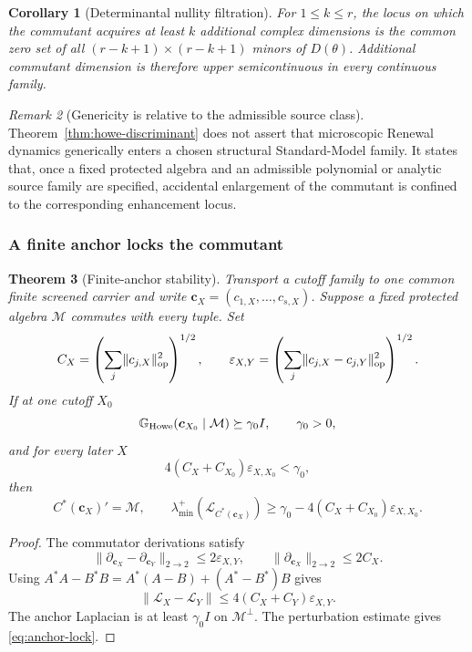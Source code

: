 \documentclass[11pt]{article}
\newtheorem{theorem}{Theorem}[section]
\newtheorem{corollary}[theorem]{Corollary}
\theoremstyle{definition}
\theoremstyle{remark}
\newtheorem{remark}[theorem]{Remark}
\newcommand{\norm}[1]{\lVert#1\rVert}
\newcommand{\M}{\mathcal M}
\begin{document}
\begin{corollary}[Determinantal nullity filtration]
\label{cor:howe-nullity}
For $1\le k\le r$, the locus on which the commutant acquires at least $k$
additional complex dimensions is the common zero set of all
$(r-k+1)\times(r-k+1)$ minors of $D(\theta)$.  Additional commutant dimension
is therefore upper semicontinuous in every continuous family.
\end{corollary}

\begin{remark}[Genericity is relative to the admissible source class]
Theorem~\ref{thm:howe-discriminant} does not assert that microscopic Renewal
dynamics generically enters a chosen structural Standard-Model family.  It
states that, once a fixed protected algebra and an admissible polynomial or
analytic source family are specified, accidental enlargement of the
commutant is confined to the corresponding enhancement locus.
\end{remark}

\subsubsection{A finite anchor locks the commutant}

\begin{theorem}[Finite-anchor stability]
\label{thm:finite-anchor}
Transport a cutoff family to one common finite screened carrier and write
$\bm c_X=(c_{1,X},\ldots,c_{s,X})$.  Suppose a fixed protected algebra $\M$
commutes with every tuple.  Set
\[
C_X=\left(\sum_j\norm{c_{j,X}}_{\rm op}^2\right)^{1/2},
\qquad
\varepsilon_{X,Y}
=
\left(\sum_j\norm{c_{j,X}-c_{j,Y}}_{\rm op}^2\right)^{1/2}.
\]
If at one cutoff $X_0$
\[
\mathbb G_{\rm Howe}(\bm c_{X_0}\mid\M)
\succeq\gamma_0I,
\qquad \gamma_0>0,
\]
and for every later $X$
\begin{equation}
4(C_X+C_{X_0})\varepsilon_{X,X_0}<\gamma_0,
\label{eq:anchor-tail}
\end{equation}
then
\begin{equation}
\boxed{
C^*(\bm c_X)'=\M,
\qquad
\lambda_{\min}^+(\mathscr L_{C^*(\bm c_X)})
\ge
\gamma_0-4(C_X+C_{X_0})\varepsilon_{X,X_0}.}
\label{eq:anchor-lock}
\end{equation}
\end{theorem}

\begin{proof}
The commutator derivations satisfy
\[
\norm{\partial_{\bm c_X}-\partial_{\bm c_Y}}_{2\to2}
\le2\varepsilon_{X,Y},
\qquad
\norm{\partial_{\bm c_X}}_{2\to2}\le2C_X.
\]
Using
$A^*A-B^*B=A^*(A-B)+(A^*-B^*)B$ gives
\[
\norm{\mathscr L_X-\mathscr L_Y}
\le
4(C_X+C_Y)\varepsilon_{X,Y}.
\]
The anchor Laplacian is at least $\gamma_0I$ on $\M^\perp$.
The perturbation estimate gives \eqref{eq:anchor-lock}.
\end{proof}
\end{document}
